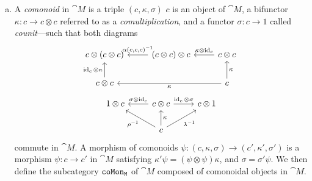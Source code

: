 \documentclass[../../deep-dive]{subfiles}
\begin{document}
\begin{definition}
\begin{enumerate}[(a)]
        \item A \emph{comonoid} in \(\cat M\) is a triple \((c, \kappa, \sigma)\)
              \(c\) is an object of \(\cat M\), a bifunctor \(\kappa: c \to c \otimes c\)
              referred to as a \emph{comultiplication}, and a functor \(\sigma: c \to 1\)
              called \emph{counit}---such that both diagrams
              \[
                  \begin{tikzcd}
                      c \otimes (c \otimes c)
                      &(c \otimes c) \otimes c
                      \ar[l, "{\alpha(c, c, c)^{-1}}"']
                      &c \otimes c
                      \ar[l, "\kappa \otimes \Id_c"']
                      \\
                      c \otimes c
                      \ar[u, "\Id_c \otimes \kappa"]
                      &&c \ar[ll, "\kappa"] \ar[u, "\kappa"']
                  \end{tikzcd}
              \]
              \[
                  \begin{tikzcd}
                      1 \otimes c
                      & c \otimes c
                      \ar[l, "\sigma \otimes \Id_c"']
                      \ar[r, "\Id_c \otimes \sigma"]
                      &c \otimes 1
                      \\
                      &c \ar[u, "\kappa"'] \ar[lu, "\rho^{-1}"] \ar[ru, "\lambda^{-1}"'] &
                  \end{tikzcd}
              \]
              commute in \(\cat M\). A morphism of comonoids
              \(\psi: (c, \kappa, \sigma) \to (c', \kappa', \sigma')\) is a morphism
              \(\psi: c \to c'\) in \(\cat M\) satisfying
              \(\kappa' \psi = (\psi \otimes \psi) \kappa\), and \(\sigma = \sigma'
              \psi\). We then define the subcategory \({\texttt{coMon}}_{\texttt M}\) of \(\cat M\)
              composed of comonoidal objects in \(\cat M\).
    \end{enumerate}
\end{definition}
\end{document}
